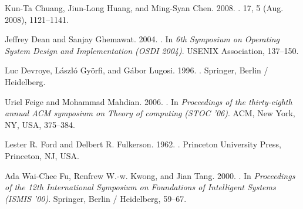 \begin{thebibliography}{00}
{Kun-Ta Chuang}, {Jiun-Long Huang}, {and} {Ming-Syan Chen}. 2008.
\newblock {}.
 {17}, 5 (Aug. 2008), 1121--1141.
\newblock


{Jeffrey Dean} {and} {Sanjay Ghemawat}. 2004.
\newblock {}. In {\em 6th Symposium on Operating System Design and Implementation
               (OSDI 2004)}. USENIX Association, 137--150.
\newblock


{Luc Devroye}, {L{\'a}szl{\'o} Gy{\"o}rfi}, {and} {G\'{a}bor Lugosi}. 1996.
.
\newblock Springer, Berlin / Heidelberg.


{Uriel Feige} {and} {Mohammad Mahdian}. 2006.
\newblock {}. In {\em
  Proceedings of the thirty-eighth annual ACM symposium on Theory of computing}
  {\em (STOC '06)}. ACM, New York, NY, USA, 375--384.

{Lester R. Ford} {and} {Delbert R. Fulkerson}. 1962.
.
\newblock Princeton University Press, Princeton, NJ, USA.

{Ada Wai-Chee Fu}, {Renfrew W.-w. Kwong}, {and} {Jian Tang}. 2000.
\newblock {}. In {\em
  Proceedings of the 12th International Symposium on Foundations of Intelligent
  Systems} {\em (ISMIS '00)}. Springer, Berlin / Heidelberg, 59--67.



\end{thebibliography}
